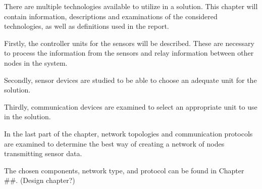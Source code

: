 There are multiple technologies available to utilize in a solution. This chapter will contain information, descriptions and examinations of the considered technologies, as well as definitions used in the report.

Firstly, the controller units for the sensors will be described. These are necessary to process the information from the sensors and relay information between other nodes in the system.

Secondly, sensor devices are studied to be able to choose an adequate unit for the solution.

Thirdly, communication devices are examined to select an appropriate unit to use in the solution. 

In the last part of the chapter, network topologies and communication protocols are examined to determine the best way of creating a network of nodes transmitting sensor data.

The chosen components, network type, and protocol can be found in Chapter \#\#. (Design chapter?)








